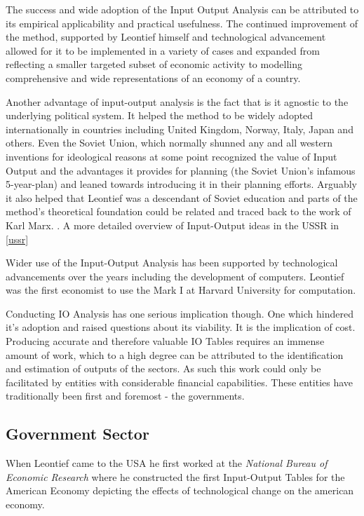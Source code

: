 \documentclass[12pt,a4paper]{scrartcl}
\begin{document}
	The success and wide adoption of the Input Output Analysis can be attributed to its empirical applicability and practical usefulness. The continued improvement of the method, supported by Leontief himself and technological advancement allowed for it to be implemented in a variety of cases and expanded from reflecting a smaller targeted subset of economic activity to modelling comprehensive and wide representations of an economy of a country.
	
	Another advantage of input-output analysis is the fact that is it agnostic to the underlying political system. It helped the method to be widely adopted internationally in countries including United Kingdom, Norway, Italy, Japan and others. Even the Soviet Union, which normally shunned any and all western inventions for ideological reasons at some point recognized the value of Input Output and the advantages it provides for planning (the Soviet Union's infamous 5-year-plan) and leaned towards introducing it in their planning efforts. Arguably it also helped that Leontief was a descendant of Soviet education and parts of the method's theoretical foundation could be related and traced back to the work of Karl Marx. \cite[p.297]{rose1995}. A more detailed overview of Input-Output ideas in the USSR in \ref{ussr}
	
	Wider use of the Input-Output Analysis has been supported by technological advancements over the years including the development of computers. Leontief was the first economist to use the Mark I at Harvard University for computation.

	Conducting IO Analysis has one serious implication though. One which hindered it's adoption and raised questions about its viability. It is the implication of cost. Producing accurate and therefore valuable IO Tables requires an immense amount of work, which to a high degree can be attributed to the identification and estimation of outputs of the sectors. As such this work could only be facilitated by entities with considerable financial capabilities. These entities have traditionally been first and foremost - the governments.

	\subsection{Government Sector}
	
	When Leontief came to the USA he first worked at the\textit{ National Bureau of Economic Research} where he constructed the first Input-Output Tables for the American Economy depicting the effects of technological change on the american economy.
	
\end{document}
